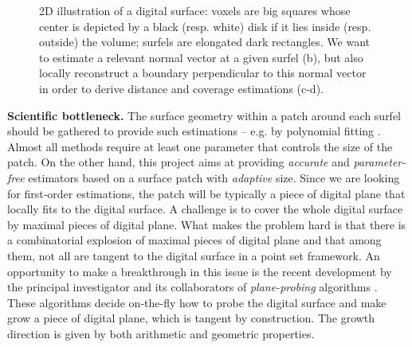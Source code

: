 \begin{figure}[hb]
  \centering
{} \hspace{0.05\textwidth}
 \hspace{0.05\textwidth}
 \hspace{0.05\textwidth}
 \caption{2D illustration of a digital surface: voxels are big squares whose center is depicted by a black (resp. white) disk if it lies inside (resp. outside) the volume; surfels are elongated dark rectangles. We want to estimate a relevant normal vector at a given surfel (b), but also locally reconstruct a boundary perpendicular to this normal vector in order to derive distance and coverage estimations (c-d).} 
\label{fig:2D} 
\end{figure}

\noindent\textbf{Scientific bottleneck.}
The surface geometry within a patch around each surfel should be gathered to provide such estimations
-- e.g. by polynomial fitting \cite{Cazals2005,Cazals2008}.
Almost all methods require at least one parameter that controls the size of the patch.  
On the other hand, this project aims at providing \emph{accurate} and \emph{parameter-free} estimators
based on a surface patch with \emph{adaptive} size.
Since we are looking for first-order estimations, the patch will be typically a piece of digital plane
that locally fits to the digital surface. %
A challenge is to cover the whole digital surface by maximal pieces of digital plane. 
What makes the problem hard is that there is a combinatorial explosion
of maximal pieces of digital plane \cite{Sivignon2009} and that among them,
not all are tangent to the digital surface in a point set framework.  
An opportunity to make a breakthrough in this issue is the recent development
by the principal investigator and its collaborators of \emph{plane-probing}
algorithms \cite{LPRTCS2016, LPRDGCI2016, LPRJMIV2017}. These algorithms decide
on-the-fly how to probe the digital surface and make grow a piece of digital plane,
which is tangent by construction. The growth direction is given by both arithmetic and geometric properties.

